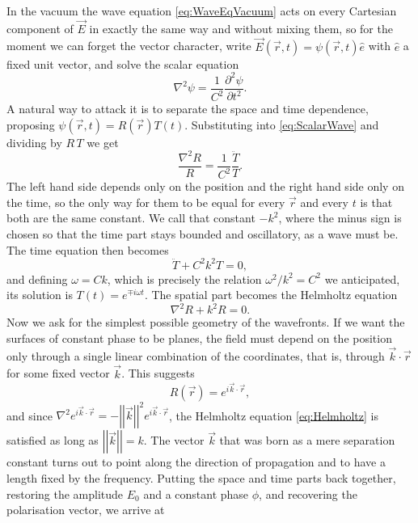        In the vacuum the wave equation \ref{eq:WaveEqVacuum} acts on every Cartesian component of $\vec{E}$ in exactly the same way and without mixing them, so for the moment we can forget the vector character, write $\vec{E}(\vec{r},t) = \psi(\vec{r},t)\hat{e}$ with $\hat{e}$ a fixed unit vector, and solve the scalar equation
       \begin{equation}\label{eq:ScalarWave}
            \nabla^2 \psi = \frac{1}{C^2}\frac{\partial^2\psi}{\partial t^2}.
       \end{equation}
       A natural way to attack it is to separate the space and time dependence, proposing $\psi(\vec{r},t) = R(\vec{r})T(t)$. Substituting into \ref{eq:ScalarWave} and dividing by $R\,T$ we get
       \begin{equation*}
            \frac{\nabla^2 R}{R} = \frac{1}{C^2}\frac{\ddot{T}}{T}.
       \end{equation*}
       The left hand side depends only on the position and the right hand side only on the time, so the only way for them to be equal for every $\vec{r}$ and every $t$ is that both are the same constant. We call that constant $-k^2$, where the minus sign is chosen so that the time part stays bounded and oscillatory, as a wave must be. The time equation then becomes
       \begin{equation*}
            \ddot{T} + C^2 k^2 T = 0,
       \end{equation*}
       and defining $\omega = Ck$, which is precisely the relation $\omega^2/k^2 = C^2$ we anticipated, its solution is $T(t) = e^{\mp i\omega t}$. The spatial part becomes the Helmholtz equation
       \begin{equation}\label{eq:Helmholtz}
            \nabla^2 R + k^2 R = 0.
       \end{equation}
       Now we ask for the simplest possible geometry of the wavefronts. If we want the surfaces of constant phase to be planes, the field must depend on the position only through a single linear combination of the coordinates, that is, through $\vec{k}\cdot\vec{r}$ for some fixed vector $\vec{k}$. This suggests
       \begin{equation*}
            R(\vec{r}) = e^{i\vec{k}\cdot\vec{r}},
       \end{equation*}
       and since $\nabla^2 e^{i\vec{k}\cdot\vec{r}} = -\left|\left|\vec{k}\right|\right|^2 e^{i\vec{k}\cdot\vec{r}}$, the Helmholtz equation \ref{eq:Helmholtz} is satisfied as long as $\left|\left|\vec{k}\right|\right| = k$. The vector $\vec{k}$ that was born as a mere separation constant turns out to point along the direction of propagation and to have a length fixed by the frequency. Putting the space and time parts back together, restoring the amplitude $E_0$ and a constant phase $\phi$, and recovering the polarisation vector, we arrive at
